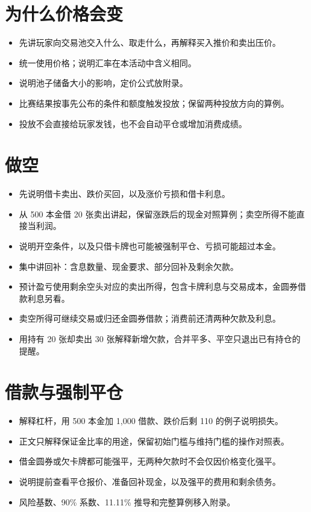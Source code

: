 \section{为什么价格会变}
\begin{itemize}
  \item 先讲玩家向交易池交入什么、取走什么，再解释买入推价和卖出压价。
  \item 统一使用价格；说明汇率在本活动中含义相同。
  \item 说明池子储备大小的影响，定价公式放附录。
  \item 比赛结果按事先公布的条件和额度触发投放；保留两种投放方向的算例。
  \item 投放不会直接给玩家发钱，也不会自动平仓或增加消费成绩。
\end{itemize}

\section{做空}
\begin{itemize}
  \item 先说明借卡卖出、跌价买回，以及涨价亏损和借卡利息。
  \item 从 500 本金借 20 张卖出讲起，保留涨跌后的现金对照算例；卖空所得不能直接当利润。
  \item 说明开空条件，以及只借卡牌也可能被强制平仓、亏损可能超过本金。
  \item 集中讲回补：含息数量、现金要求、部分回补及剩余欠款。
  \item 预计盈亏使用剩余空头对应的卖出所得，包含卡牌利息与交易成本，金圆券借款利息另看。
  \item 卖空所得可继续交易或归还金圆券借款；消费前还清两种欠款及利息。
  \item 用持有 20 张却卖出 30 张解释新增欠款，合并平多、平空只退出已有持仓的提醒。
\end{itemize}

\section{借款与强制平仓}
\begin{itemize}
  \item 解释杠杆，用 500 本金加 1,000 借款、跌价后剩 110 的例子说明损失。
  \item 正文只解释保证金比率的用途，保留初始门槛与维持门槛的操作对照表。
  \item 借金圆券或欠卡牌都可能强平，无两种欠款时不会仅因价格变化强平。
  \item 说明提前查看平仓报价、准备回补现金，以及强平的费用和剩余债务。
  \item 风险基数、90\% 系数、11.11\% 推导和完整算例移入附录。
\end{itemize}


